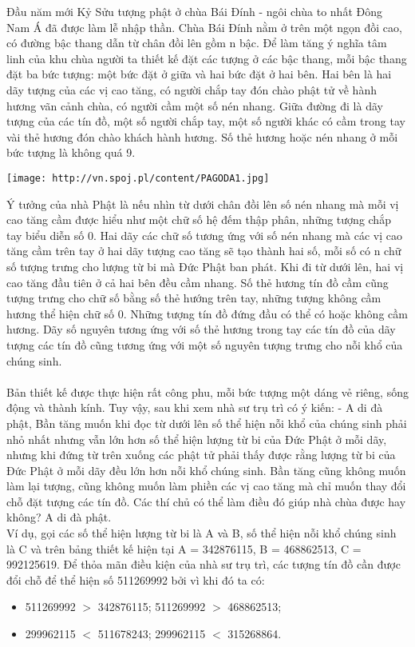 Đầu năm mới Kỷ Sửu tượng phật ở chùa Bái Đính - ngôi chùa to nhất Đông Nam Á đã được làm lễ nhập thần. Chùa Bái Đính nằm ở trên một ngọn đồi cao, có đường bậc thang dẫn từ chân đồi lên gồm n bậc. Để làm tăng ý nghĩa tâm linh của khu chùa người ta thiết kế đặt các tượng ở các bậc thang, mỗi bậc thang đặt ba bức tượng: một bức đặt ở giữa và hai bức đặt ở hai bên. Hai bên là hai dãy tượng của các vị cao tăng, có người chắp tay đón chào phật tử về hành hương vãn cảnh chùa, có người cầm một số nén nhang. Giữa đường đi là dãy tượng của các tín đồ, một số người chắp tay, một số người khác có cầm trong tay vài thẻ hương đón chào khách hành hương. Số thẻ hương hoặc nén nhang ở mỗi bức tượng là không quá 9.


\texttt{[image: http://vn.spoj.pl/content/PAGODA1.jpg]}

Ý tưởng của nhà Phật là nếu nhìn từ dưới chân đồi lên số nén nhang mà mỗi vị cao tăng cầm được hiểu như một chữ số hệ đếm thập phân, những tượng chắp tay biểu diễn số 0. Hai dãy các chữ số tương ứng với số nén nhang mà các vị cao tăng cầm trên tay ở hai dãy tượng cao tăng sẽ tạo thành hai số, mỗi số có n chữ số tượng trưng cho lượng từ bi mà Đức Phật ban phát. Khi đi từ dưới lên, hai vị cao tăng đầu tiên ở cả hai bên đều cầm nhang. Số thẻ hương tín đồ cầm cũng tượng trưng cho chữ số bằng số thẻ hướng trên tay, những tượng không cầm hương thể hiện chữ số 0. Những tượng tín đồ đứng đầu có thể có hoặc không cầm hương. Dãy số nguyên tương ứng với số thẻ hương trong tay các tín đồ của dãy tượng các tín đồ cũng tương ứng với một số nguyên tượng trưng cho nỗi khổ của chúng sinh.
\\
\\Bản thiết kế được thực hiện rất công phu, mỗi bức tượng một dáng vẻ riêng, sống động và thành kính. Tuy vậy, sau khi xem nhà sư trụ trì có ý kiến: - A di đà phật, Bần tăng muốn khi đọc từ dưới lên số thể hiện nỗi khổ của chúng sinh phải nhỏ nhất nhưng vẫn lớn hơn số thể hiện lượng từ bi của Đức Phật ở mỗi dãy, nhưng khi đứng từ trên xuống các phật tử phải thấy được rằng lượng từ bi của Đức Phật ở mỗi dãy đều lớn hơn nỗi khổ chúng sinh. Bần tăng cũng không muốn làm lại tượng, cũng không muốn làm phiền các vị cao tăng mà chỉ muốn thay đổi chỗ đặt tượng các tín đồ. Các thí chủ có thể làm điều đó giúp nhà chùa được hay không? A di đà phật.
\\Ví dụ, gọi các số thể hiện lượng từ bi là A và B, số thể hiện nỗi khổ chúng sinh là C và trên bảng thiết kế hiện tại A = 342876115, B = 468862513, C = 992125619. Để thỏa mãn điều kiện của nhà sư trụ trì, các tượng tín đồ cần được đổi chỗ để thể hiện số 511269992 bởi vì khi đó ta có:
\begin{itemize}
	\item 511269992 $>$ 342876115; 511269992 $>$ 468862513;
	\item 299962115 $<$ 511678243; 299962115 $<$ 315268864.
\end{itemize}


